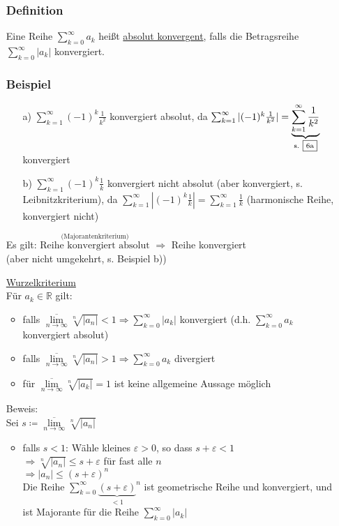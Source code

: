 \documentclass[12pt, titlepage]{article}
\newcommand{\R}{\mathds{R}}
\newcommand{\infn}{n\rightarrow\infty}
\renewcommand{\>}{\rightarrow}
\renewcommand{\*}{\cdot}
\renewcommand{\epsilon}{\varepsilon}
\renewcommand{\limsup}[1]{\underset{#1}{\overline{\lim}}}
\begin{document}
\begin{itemize}
	\subsubsection*{Definition}
	Eine Reihe $\sum_{k=0}^{\infty}a_k$ heißt \underline{absolut konvergent}, falls die Betragsreihe $\sum_{k=0}^{\infty}|a_k|$ konvergiert.\\
	\subsubsection*{Beispiel}
	\begin{itemize}
		\item[a)] $\sum_{k=1}^{\infty}(-1)^k\frac{1}{k^2}$ konvergiert absolut, da $\sum_{k=1}^{\infty}|(-1)^k\frac{1}{k^2}|=\underbrace{\sum_{k=1}^{\infty}\frac{1}{k^2}}_{\textrm{s. \fbox{6a}}}$ konvergiert
		\item[b)] $\sum_{k=1}^{\infty}(-1)^k\frac{1}{k}$ konvergiert nicht absolut (aber konvergiert, s. Leibnitzkriterium), da $\sum_{k=1}^{\infty}|(-1)^k\frac{1}{k}|=\sum_{k=1}^{\infty}\frac{1}{k}$ (harmonische Reihe, konvergiert nicht)
	\end{itemize}
	Es gilt: $\overset{\textrm{(Majorantenkriterium)}}{\textrm{Reihe konvergiert absolut}}$ $\Rightarrow$ Reihe konvergiert\\
	(aber nicht umgekehrt, s. Beispiel b))
	\item[\fbox{6a}] \underline{Wurzelkriterium}\\
	Für $a_k\in\R$ gilt:
	\begin{itemize}
		\item falls $\limsup{\infn}\sqrt[n]{|a_n|}<1\Rightarrow\sum_{k=0}^{\infty}|a_k|$ konvergiert (d.h. $\sum_{k=0}^{\infty}a_k$ konvergiert absolut)
		\item falls $\limsup{\infn}\sqrt[n]{|a_n|}>1\Rightarrow\sum_{k=0}^{\infty}a_k$ divergiert
		\item für $\limsup{\infn}\sqrt[n]{|a_k|}=1$ ist keine allgemeine Aussage möglich
	\end{itemize}
	Beweis:\\
	Sei $s\coloneqq\limsup{\infn}\sqrt[n]{|a_n|}$
	\begin{itemize}
		\item falls $s<1$: Wähle kleines $\epsilon>0$, so dass $s+\epsilon<1$\\
		$\Rightarrow\sqrt[n]{|a_n|}\leq s+\epsilon$ für fast alle $n$\\
		$\Rightarrow|a_n|\leq(s+\epsilon)^n$\\
		Die Reihe $\sum_{k=0}^{\infty}{\underbrace{(s+\epsilon)}_{<1}}^n$ ist geometrische Reihe und konvergiert, und ist Majorante für die Reihe $\sum_{k=0}^{\infty}|a_k|$

\end{itemize}
\end{itemize}
\end{document}
